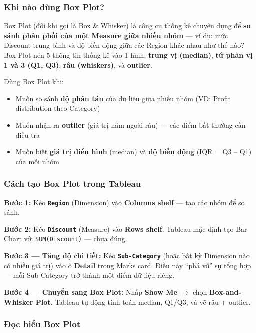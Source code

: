 \documentclass[12pt]{article}
\begin{document}
\subsubsection{Khi nào dùng Box Plot?}

\noindent Box Plot (đôi khi gọi là Box \& Whisker) là công cụ thống kê chuyên dụng để \textbf{so sánh phân phối của một Measure giữa nhiều nhóm} --- ví dụ: mức Discount trung bình và độ biến động giữa các Region khác nhau như thế nào? Box Plot nén 5 thông tin thống kê vào 1 hình: \textbf{trung vị (median)}, \textbf{tứ phân vị 1 và 3 (Q1, Q3)}, \textbf{râu (whiskers)}, và \textbf{outlier}.

\noindent Dùng Box Plot khi:
\begin{itemize}[nosep]
    \item Muốn so sánh \textbf{độ phân tán} của dữ liệu giữa nhiều nhóm (VD: Profit distribution theo Category)
    \item Muốn nhận ra \textbf{outlier} (giá trị nằm ngoài râu) --- các điểm bất thường cần điều tra
    \item Muốn biết \textbf{giá trị điển hình} (median) và \textbf{độ biến động} (IQR = Q3 -- Q1) của mỗi nhóm
\end{itemize}

\subsubsection{Cách tạo Box Plot trong Tableau}

\noindent \textbf{Bước 1:} Kéo \textbf{\texttt{Region}} (Dimension) vào \textbf{Columns shelf} --- tạo các nhóm để so sánh.

\noindent \textbf{Bước 2:} Kéo \textbf{\texttt{Discount}} (Measure) vào \textbf{Rows shelf}. Tableau mặc định tạo Bar Chart với \texttt{SUM(Discount)} --- chưa đúng.

\noindent \textbf{Bước 3 --- Tăng độ chi tiết:} Kéo \textbf{\texttt{Sub-Category}} (hoặc bất kỳ Dimension nào có nhiều giá trị) vào ô \textbf{Detail} trong Marks card. Điều này ``phá vỡ'' sự tổng hợp --- mỗi Sub-Category trở thành một điểm dữ liệu riêng.

\noindent \textbf{Bước 4 --- Chuyển sang Box Plot:} Nhấp \textbf{Show Me} $\rightarrow$ chọn \textbf{Box-and-Whisker Plot}. Tableau tự động tính toán median, Q1/Q3, và vẽ râu + outlier.

\subsubsection{Đọc hiểu Box Plot}
\end{document}
